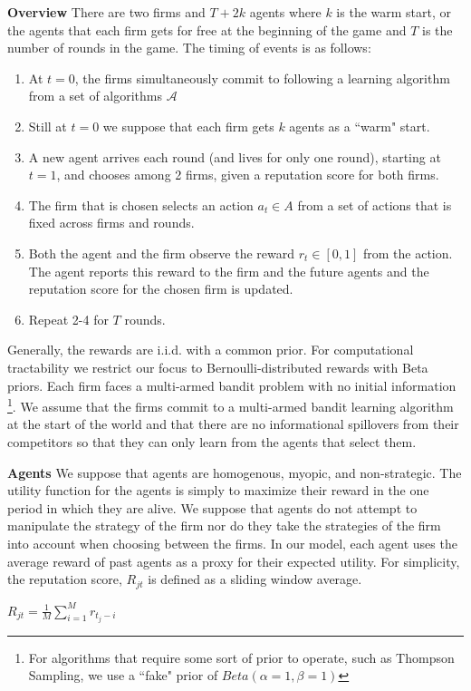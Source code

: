 \documentclass{article}
\theoremstyle{definition}
\begin{document}
\textbf{Overview} There are two firms and $T+2k$ agents where $k$ is the warm start, or the agents that each firm gets for free at the beginning of the game and $T$ is the number of rounds in the game. The timing of events is as follows:
\begin{enumerate}
\item At $t = 0$, the firms simultaneously commit to following a learning algorithm from a set of algorithms $\mathcal{A}$
\item Still at $t=0$ we suppose that each firm gets $k$ agents as a ``warm" start.
\item A new agent arrives each round (and lives for only one round), starting at $t = 1$, and chooses among 2 firms, given a reputation score for both firms.
\item The firm that is chosen selects an action $a_{t} \in A$ from a set of actions that is fixed across firms and rounds.
\item Both the agent and the firm observe the reward $r_t \in [0, 1]$ from the action. The agent reports this reward to the firm and the future agents and the reputation score for the chosen firm is updated.
\item Repeat 2-4 for $T$ rounds.
\end{enumerate}

Generally, the rewards are i.i.d. with a common prior.  For computational tractability we restrict our focus to Bernoulli-distributed rewards with Beta priors. Each firm faces a multi-armed bandit problem with no initial information \footnote{For algorithms that require some sort of prior to operate, such as Thompson Sampling, we use a ``fake" prior of $Beta(\alpha=1,\beta=1)$}. We assume that the firms commit to a multi-armed bandit learning algorithm at the start of the world and that there are no informational spillovers from their competitors so that they can only learn from the agents that select them.

\noindent \textbf{Agents} We suppose that agents are homogenous, myopic, and non-strategic. The utility function for the agents is simply to maximize their reward in the one period in which they are alive. We suppose that agents do not attempt to manipulate the strategy of the firm nor do they take the strategies of the firm into account when choosing between the firms. In our model, each agent uses the average reward of past agents as a proxy for their expected utility. For simplicity, the reputation score, $R_{jt}$ is defined as a sliding window average.
\begin{center}
$R_{jt} = \frac{1}{M} \sum\limits_{i=1}^{M} r_{t_j-i}$
\end{center}
\end{document}
